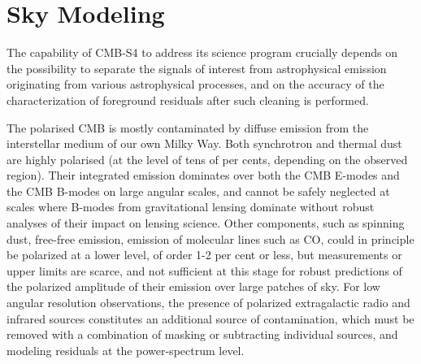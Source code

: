 
%
%

\section{Sky Modeling}

The capability of CMB-S4 to address its science program crucially depends on the possibility to separate the signals of interest from astrophysical emission originating from various astrophysical processes, and on the accuracy of the characterization of foreground residuals after such cleaning is performed. 

The polarised CMB is mostly contaminated by diffuse emission from the interstellar medium of our own Milky Way. Both synchrotron and thermal dust are highly polarised (at the level of tens of per cents, depending on the observed region). Their integrated emission dominates over both the CMB E-modes and the CMB B-modes on large angular scales, and cannot be safely neglected at scales where B-modes from gravitational lensing dominate without robust analyses of their impact on lensing science. Other components, such as spinning dust, free-free emission, emission of molecular lines such as CO, could in principle be polarized at a lower level, of order 1-2 per cent or less, but measurements or upper limits are scarce, and not sufficient at this stage for robust predictions of the polarized amplitude of their emission over large patches of sky. For low angular resolution observations, the presence of polarized extragalactic radio and infrared sources constitutes an additional source of contamination, which must be removed with a combination of masking or subtracting individual sources, and modeling residuals at the power-spectrum level.

